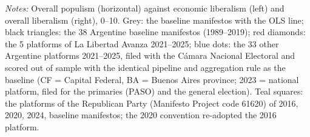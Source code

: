 \par\smallskip\begin{minipage}{\linewidth}\scriptsize\textit{Notes:} Overall populism (horizontal) against economic liberalism (left) and overall liberalism (right), 0--10. Grey: the baseline manifestos with the OLS line; black triangles: the 38 Argentine baseline manifestos (1989--2019); red diamonds: the 5 platforms of La Libertad Avanza 2021--2025; blue dots: the 33 other Argentine platforms 2021--2025, filed with the C\'amara Nacional Electoral and scored out of sample with the identical pipeline and aggregation rule as the baseline (CF = Capital Federal, BA = Buenos Aires province; 2023 = national platform, filed for the primaries (PASO) and the general election). Teal squares: the platforms of the Republican Party (Manifesto Project code 61620) of 2016, 2020, 2024, baseline manifestos; the 2020 convention re-adopted the 2016 platform.\end{minipage}
